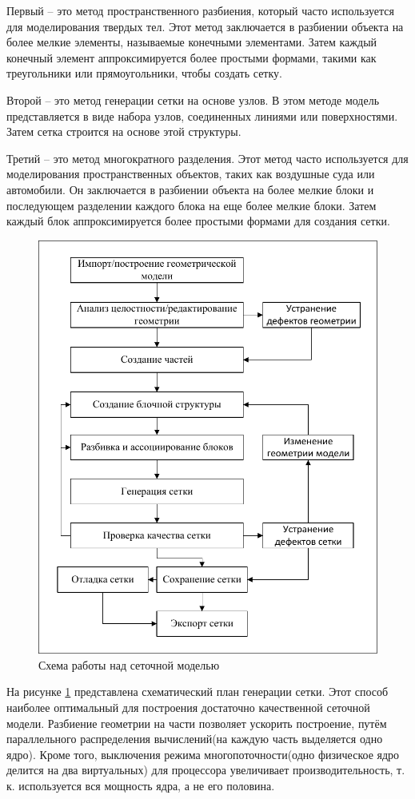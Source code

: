 	Первый -- это метод пространственного разбиения, который часто используется для моделирования твердых тел. Этот метод заключается в разбиении объекта на более мелкие элементы, называемые конечными элементами. Затем каждый конечный элемент аппроксимируется более простыми формами, такими как треугольники или прямоугольники, чтобы создать сетку.
	
	Второй -- это метод генерации сетки на основе узлов. В этом методе модель представляется в виде набора узлов, соединенных линиями или поверхностями. Затем сетка строится на основе этой структуры.
	
	Третий -- это метод многократного разделения. Этот метод часто используется для моделирования пространственных объектов, таких как воздушные суда или автомобили. Он заключается в разбиении объекта на более мелкие блоки и последующем разделении каждого блока на еще более мелкие блоки. Затем каждый блок аппроксимируется более простыми формами для создания сетки.
	
	\begin{figure}[H]
		\centering
		\includegraphics[width=0.8\linewidth]{../Assets/СхемаСозданияСетки}
		\caption{Схема работы над сеточной моделью}
		\label{fig:meshScheme}
	\end{figure}
	
	На рисунке \ref{fig:meshScheme} представлена схематический план генерации сетки. Этот способ наиболее оптимальный для построения достаточно качественной сеточной модели. Разбиение геометрии на части позволяет ускорить построение, путём параллельного распределения вычислений(на каждую часть выделяется одно ядро). Кроме того, выключения режима многопоточности(одно физическое ядро делится на два виртуальных) для процессора увеличивает производительность, т. к. используется вся мощность ядра, а не его половина.
	
